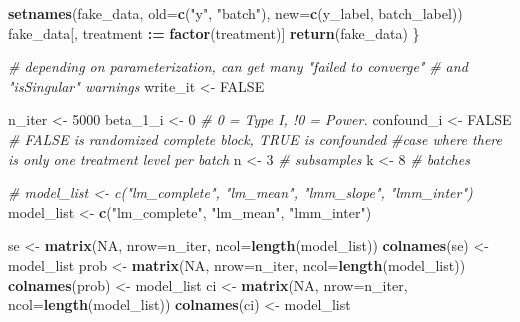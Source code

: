 \documentclass[]{book}
\newenvironment{Shaded}{\begin{snugshade}}{\end{snugshade}}
\newcommand{\CommentTok}[1]{\textcolor[rgb]{0.56,0.35,0.01}{\textit{#1}}}
\newcommand{\DataTypeTok}[1]{\textcolor[rgb]{0.13,0.29,0.53}{#1}}
\newcommand{\DecValTok}[1]{\textcolor[rgb]{0.00,0.00,0.81}{#1}}
\newcommand{\ErrorTok}[1]{\textcolor[rgb]{0.64,0.00,0.00}{\textbf{#1}}}
\newcommand{\KeywordTok}[1]{\textcolor[rgb]{0.13,0.29,0.53}{\textbf{#1}}}
\newcommand{\NormalTok}[1]{#1}
\newcommand{\OperatorTok}[1]{\textcolor[rgb]{0.81,0.36,0.00}{\textbf{#1}}}
\newcommand{\OtherTok}[1]{\textcolor[rgb]{0.56,0.35,0.01}{#1}}
\newcommand{\StringTok}[1]{\textcolor[rgb]{0.31,0.60,0.02}{#1}}
\begin{document}
\begin{Shaded}
\begin{Highlighting}[]
  \KeywordTok{setnames}\NormalTok{(fake_data, }\DataTypeTok{old=}\KeywordTok{c}\NormalTok{(}\StringTok{"y"}\NormalTok{, }\StringTok{"batch"}\NormalTok{), }\DataTypeTok{new=}\KeywordTok{c}\NormalTok{(y_label, batch_label))}
\NormalTok{  fake_data[, treatment }\OperatorTok{:}\ErrorTok{=}\StringTok{ }\KeywordTok{factor}\NormalTok{(treatment)]}
  \KeywordTok{return}\NormalTok{(fake_data)}
\NormalTok{\}}
\end{Highlighting}
\end{Shaded}

\begin{Shaded}
\begin{Highlighting}[]
\CommentTok{# depending on parameterization, can get many "failed to converge"}
\CommentTok{# and "isSingular" warnings}
\NormalTok{write_it <-}\StringTok{ }\OtherTok{FALSE}

\NormalTok{n_iter <-}\StringTok{ }\DecValTok{5000}
\NormalTok{beta_}\DecValTok{1}\NormalTok{_i <-}\StringTok{ }\DecValTok{0}  \CommentTok{# 0 = Type I, !0 = Power.}
\NormalTok{confound_i <-}\StringTok{ }\OtherTok{FALSE} \CommentTok{# FALSE is randomized complete block, TRUE is confounded}
 \CommentTok{#case where there is only one treatment level per batch}
\NormalTok{n <-}\StringTok{ }\DecValTok{3} \CommentTok{# subsamples}
\NormalTok{k <-}\StringTok{ }\DecValTok{8} \CommentTok{# batches}

\CommentTok{# model_list <- c("lm_complete", "lm_mean", "lmm_slope", "lmm_inter")}
\NormalTok{model_list <-}\StringTok{ }\KeywordTok{c}\NormalTok{(}\StringTok{"lm_complete"}\NormalTok{, }\StringTok{"lm_mean"}\NormalTok{, }\StringTok{"lmm_inter"}\NormalTok{)}

\NormalTok{se <-}\StringTok{ }\KeywordTok{matrix}\NormalTok{(}\OtherTok{NA}\NormalTok{, }\DataTypeTok{nrow=}\NormalTok{n_iter, }\DataTypeTok{ncol=}\KeywordTok{length}\NormalTok{(model_list))}
\KeywordTok{colnames}\NormalTok{(se) <-}\StringTok{ }\NormalTok{model_list}
\NormalTok{prob <-}\StringTok{ }\KeywordTok{matrix}\NormalTok{(}\OtherTok{NA}\NormalTok{, }\DataTypeTok{nrow=}\NormalTok{n_iter, }\DataTypeTok{ncol=}\KeywordTok{length}\NormalTok{(model_list))}
\KeywordTok{colnames}\NormalTok{(prob) <-}\StringTok{ }\NormalTok{model_list}
\NormalTok{ci <-}\StringTok{ }\KeywordTok{matrix}\NormalTok{(}\OtherTok{NA}\NormalTok{, }\DataTypeTok{nrow=}\NormalTok{n_iter, }\DataTypeTok{ncol=}\KeywordTok{length}\NormalTok{(model_list))}
\KeywordTok{colnames}\NormalTok{(ci) <-}\StringTok{ }\NormalTok{model_list}


\end{Highlighting}
\end{Shaded}
\end{document}
